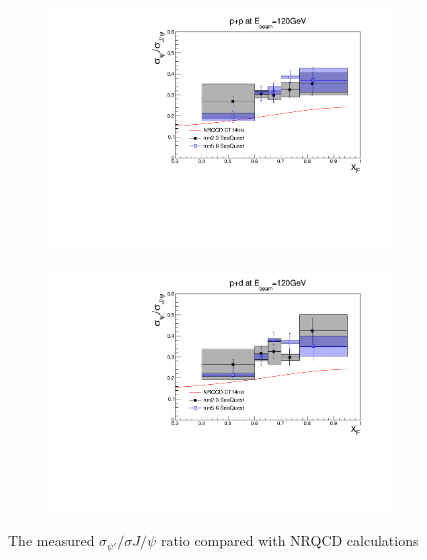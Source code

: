 \documentclass[twocolumn,aps,unsortedaddress,superscriptaddress,prd,floatfix,showpacs,linenumbers]{revtex4-2}
\begin{document}
\begin{figure}
	\begin{subfigure}{0.45\linewidth}
		\includegraphics[width=\linewidth]{figures/crossSections/xF/ratio_xF_LH2_5-6_5770}
	\end{subfigure}
	\begin{subfigure}{0.45\linewidth}
		\includegraphics[width=\linewidth]{figures/crossSections/xF/ratio_xF_LD2_5-6_5770}
	\end{subfigure}
	\caption{The measured $\sigma_{\psi'}/\sigma{J/\psi}$ ratio compared with NRQCD calculations}
	\label{fig:psip_jpsi_ratio_xF}
\end{figure}
\end{document}
